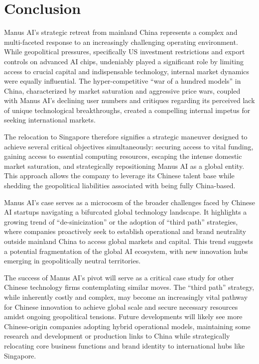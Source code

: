 \section{Conclusion}

Manus AI's strategic retreat from mainland China represents a complex and multi-faceted response to an increasingly challenging operating environment.
While geopolitical pressures, specifically US investment restrictions and export controls on advanced AI chips, undeniably played a significant role by limiting access to crucial capital and indispensable technology, internal market dynamics were equally influential.
The hyper-competitive ``war of a hundred models'' in China, characterized by market saturation and aggressive price wars, coupled with Manus AI's declining user numbers and critiques regarding its perceived lack of unique technological breakthroughs, created a compelling internal impetus for seeking international markets.

The relocation to Singapore therefore signifies a strategic maneuver designed to achieve several critical objectives simultaneously: securing access to vital funding, gaining access to essential computing resources, escaping the intense domestic market saturation, and strategically repositioning Manus AI as a global entity.
This approach allows the company to leverage its Chinese talent base while shedding the geopolitical liabilities associated with being fully China-based.

Manus AI's case serves as a microcosm of the broader challenges faced by Chinese AI startups navigating a bifurcated global technology landscape.
It highlights a growing trend of ``de-sinicization'' or the adoption of ``third path'' strategies, where companies proactively seek to establish operational and brand neutrality outside mainland China to access global markets and capital.
This trend suggests a potential fragmentation of the global AI ecosystem, with new innovation hubs emerging in geopolitically neutral territories.

The success of Manus AI's pivot will serve as a critical case study for other Chinese technology firms contemplating similar moves.
The ``third path'' strategy, while inherently costly and complex, may become an increasingly vital pathway for Chinese innovation to achieve global scale and secure necessary resources amidst ongoing geopolitical tensions.
Future developments will likely see more Chinese-origin companies adopting hybrid operational models, maintaining some research and development or production links to China while strategically relocating core business functions and brand identity to international hubs like Singapore.

\printbibliography


